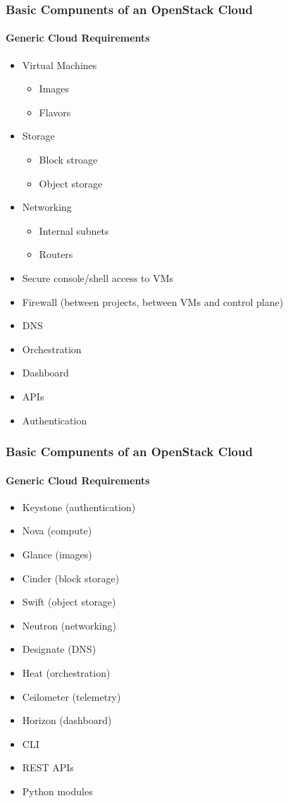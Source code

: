 \documentclass[helvetica,english,utf8,notitle,nologo]{beamer}
\begin{document}
\begin{frame}
  \frametitle{Basic Compunents of an OpenStack Cloud}
  \framesubtitle{Generic Cloud Requirements}
  \begin{itemize}
  \item Virtual Machines
    \begin{itemize}
    \item Images
    \item Flavors
    \end{itemize}
  \item Storage
    \begin{itemize}
    \item Block stroage
    \item Object storage
    \end{itemize}
  \item Networking
    \begin{itemize}
    \item Internal subnets
    \item Routers
    \end{itemize}
  \item Secure console/shell access to VMs
  \item Firewall (between projects, between VMs and control plane)
  \item DNS
  \item Orchestration
  \item Dashboard
  \item APIs
  \item Authentication
  \end{itemize}
\end{frame}

\begin{frame}
  \frametitle{Basic Compunents of an OpenStack Cloud}
  \framesubtitle{Generic Cloud Requirements}
  \begin{itemize}
    \item Keystone (authentication)
    \item Nova (compute)
    \item Glance (images)
    \item Cinder (block storage)
    \item Swift (object storage)
    \item Neutron (networking)
    \item Designate (DNS)
    \item Heat (orchestration)
    \item Ceilometer (telemetry)
    \item Horizon (dashboard)
    \item CLI
    \item REST APIs
    \item Python modules
  \end{itemize}
\end{frame}
\end{document}
